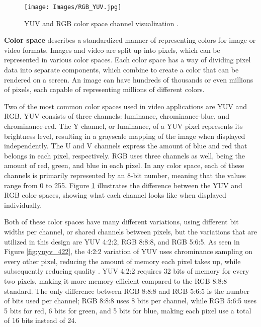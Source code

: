 \documentclass{article}
\begin{document}
    \begin{figure}[!tb] 
        \centering
        \texttt{[image: Images/RGB\_YUV.jpg]} 
        \caption{YUV and RGB color space channel visualization \cite{yuyv_rgb_img}.} 
        \label{fig:yuv_rgb} 
    \end{figure}
    \par \textbf{Color space} describes a standardized manner of representing colors for image or video formats. Images and video are split up into pixels, which can be represented in various color spaces. Each color space has a way of dividing pixel data into separate components, which combine to create a color that can be rendered on a screen. An image can have hundreds of thousands or even millions of pixels, each capable of representing millions of different colors. 
    \par Two of the most common color spaces used in video applications are YUV and RGB. YUV consists of three channels: luminance, chrominance-blue, and chrominance-red. The Y channel, or luminance, of a YUV pixel represents its brightness level, resulting in a grayscale mapping of the image when displayed independently. The U and V channels express the amount of blue and red that belongs in each pixel, respectively. RGB uses three channels as well, being the amount of red, green, and blue in each pixel. In any color space, each of these channels is primarily represented by an 8-bit number, meaning that the values range from 0 to 255. Figure \ref{fig:yuv_rgb} illustrates the difference between the YUV and RGB color spaces, showing what each channel looks like when displayed individually.

    \par Both of these color spaces have many different variations, using different bit widths per channel, or shared channels between pixels, but the variations that are utilized in this design are YUV 4:2:2, RGB 8:8:8, and RGB 5:6:5. As seen in Figure \ref{fig:yuyv_422}, the 4:2:2 variation of YUV uses chrominance sampling on every other pixel, reducing the amount of memory each pixel takes up, while subsequently reducing quality \cite{intro_color_space_vid}. YUV 4:2:2 requires 32 bits of memory for every two pixels, making it more memory-efficient compared to the RGB 8:8:8 standard. The only difference between RGB 8:8:8 and RGB 5:6:5 is the number of bits used per channel; RGB 8:8:8 uses 8 bits per channel, while RGB 5:6:5 uses 5 bits for red, 6 bits for green, and 5 bits for blue, making each pixel use a total of 16 bits instead of 24. 
\end{document}
